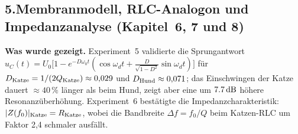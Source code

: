 ﻿\documentclass[12pt,a4paper,titlepage]{report}
\begin{document}
\subsection*{5.\enspace Membranmodell, RLC-Analogon und Impedanzanalyse
(Kapitel~6, 7 und 8)}

\textbf{Was wurde gezeigt.}
Experiment~5 validierte die Sprungantwort
$u_C(t) = U_0\bigl[1 - e^{-D\omega_0 t}(\cos\omega_d t
+ \tfrac{D}{\sqrt{1-D^2}}\sin\omega_d t)\bigr]$
für $D_{\rm Katze} = 1/(2Q_{\rm Katze}) \approx 0{,}029$
und $D_{\rm Hund} \approx 0{,}071$;
das Einschwingen der Katze dauert $\approx 40\,\%$ länger
als beim Hund, zeigt aber eine um $\SI{7{,}7}{\decibel}$ höhere
Resonanzüberhöhung.
Experiment~6 bestätigte die Impedanzcharakteristik:
$|Z(f_0)|_{\rm Katze} = R_{\rm Katze}$, wobei die Bandbreite
$\Delta f = f_0/Q$ beim Katzen-RLC um Faktor 2,4 schmaler ausfällt.
\end{document}

